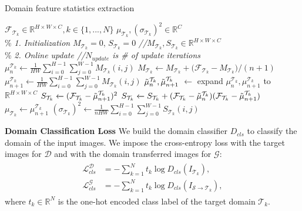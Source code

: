 \begin{algorithm}
\caption{Domain feature statistics extraction}
\label{alg:CMA}
\begin{algorithmic}[1]
 \renewcommand{\algorithmicrequire}{\textbf{Input: }}
 \renewcommand{\algorithmicensure}{\textbf{Update: }}
 \REQUIRE $\mathcal{F}_{\mathcal{T}_k} \in \mathbb{R}^{H\times W\times C}, k\in \{1,...,N \}$
 \ENSURE  $\mu_{\mathcal{T}_k}, (\sigma_{\mathcal{T}_k})^2 \in \mathbb{R}^{C}$
 \\ \% \textit{1. Initialization}
  \STATE $M_{\mathcal{T}_k} = 0$, $S_{\mathcal{T}_k} = 0 $ \textit{ \hfill//$M_{ \mathcal{T}_k}, S_{\mathcal{T}_k} \in \mathbb{R}^{H\times W\times C}$}
  \ENDFOR
 \\ \% \textit{2. Online update
  \hfill //$N_{update}$ is \# of update iterations}
  \STATE $\mu_{n}^{\mathcal{T}_k} \xleftarrow{} \frac{1}{HW} \sum_{i=0}^{H-1}\sum_{j=0}^{W-1}{M_{\mathcal{T}_k}{(i,j)}}$
  \STATE $M_{\mathcal{T}_k} \xleftarrow{} M_{\mathcal{T}_k} + ({{\mathcal{F}_{\mathcal{T}_k} - M_{\mathcal{T}_k}})/({n+1})}$
  \STATE $\mu_{n+1}^{\mathcal{T}_k} \xleftarrow{} \frac{1}{HW} \sum_{i=0}^{H-1}\sum_{j=0}^{W-1}{M_{\mathcal{T}_k}(i,j)}$
  \STATE ${\Tilde{\mu}}_{n}^{\mathcal{T}_k}, {\Tilde{\mu}}_{n+1}^{\mathcal{T}_k}$ $\leftarrow{}$ expand $\mu_{n}^{\mathcal{T}_k},\mu_{n+1}^{\mathcal{T}_k}$ to $\mathbb{R}^{H\times W\times C}$ 
  \STATE $S_{\mathcal{T}_k} \xleftarrow{} (\mathcal{F}_{\mathcal{T}_k}-{\Tilde{\mu}}_{n+1}^{\mathcal{T}_k})^2$
  \ELSE
  \STATE $S_{\mathcal{T}_k} \xleftarrow{} S_{\mathcal{T}_k} + (\mathcal{F}_{\mathcal{T}_k}-{\Tilde{\mu}}_{n}^{\mathcal{T}_k})(\mathcal{F}_{\mathcal{T}_k}-{\Tilde{\mu}}_{n+1}^{\mathcal{T}_k})$
\STATE
  $\mu_{\mathcal{T}_k} \xleftarrow{} \mu^{\mathcal{T}_k}_{n+1}$
  \STATE
  $(\sigma_{\mathcal{T}_k})^2 \xleftarrow{} \frac{1}{nHW} \sum_{i=0}^{H-1}\sum_{j=0}^{W-1}{S_{\mathcal{T}_k}(i,j)}$
  \ENDIF
  \ENDFOR
  \ENDFOR
\end{algorithmic}
\end{algorithm}

\noindent\textbf{Domain Classification Loss}
We build the domain classifier $D_{cls}$ to classify the domain of the input images.
We impose the cross-entropy loss with the target images for $\mathcal{D}$ and with the domain transferred images for $\mathcal{G}$:
\begin{gather}
\begin{split}
    \mathcal{L}_{cls}^{\mathcal{D}}
    & = -\sum_{k=1}^{N} t_k\log D_{cls}(I_{\mathcal{T}_k}), \\
    \mathcal{L}_{cls}^{\mathcal{G}}
    & = -\sum_{k=1}^{N} t_k\log D_{cls}(I_{\mathcal{S} \to {\mathcal{T}_k}}),
\end{split}
\label{eq:cls}
\end{gather}
where $t_k \in \mathbb{R}^N$ is the one-hot encoded class label of the target domain $\mathcal{T}_k$.

